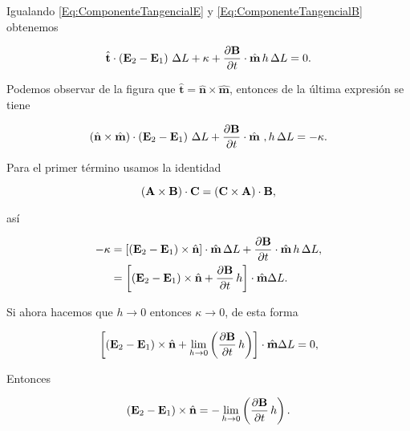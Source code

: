 Igualando \eqref{Eq:ComponenteTangencialE} y \eqref{Eq:ComponenteTangencialB} obtenemos

\begin{equation}
	\hat{\textbf{t}} \cdot \left( \E_{2} - \E_{1} \right) \, \Delta L + \kappa + \diffp{\B}{t} \cdot  \hat{\textbf{m}} \, h\, \Delta L = 0.
\end{equation}

Podemos observar de la figura que $\hat{\textbf{t}} = \hat{\textbf{n}} \times  \hat{\textbf{m}}$, entonces de la última expresión se tiene

\begin{equation}
	\left( \hat{\textbf{n}} \times  \hat{\textbf{m}} \right) \cdot \left( \E_{2} - \E_{1} \right) \, \Delta L + \diffp{\B}{t} \cdot  \hat{\textbf{m}} \ ,h \, \Delta L = -\kappa.
\end{equation}

Para el primer término usamos la identidad

\begin{equation}
\left( \textbf{A} \times \textbf{B} \right) \cdot \textbf{C} = \left( \textbf{C} \times \textbf{A} \right) \cdot \textbf{B},
\end{equation}

así

\begin{align*}
	-\kappa &= \left[ \left( \E_{2} - \E_{1} \right) \times \hat{\textbf{n}} \right] \cdot  \hat{\textbf{m}} \, \Delta L + \diffp{\B}{t} \cdot  \hat{\textbf{m}} \, h \,\Delta L,\\
					&= \left[ \left( \E_{2} - \E_{1} \right) \times \hat{\textbf{n}} + \diffp{\B}{t} \, h \right] \cdot  \hat{\textbf{m}} \Delta L.
\end{align*}

Si ahora hacemos que $h\rightarrow 0$ entonces $\kappa\rightarrow 0$, de esta forma

\begin{equation}
	\left[ \left( \E_{2} - \E_{1} \right) \times \hat{\textbf{n}} + \lim_{h\rightarrow 0} \left( \diffp{\B}{t} \, h \right) \right] \cdot  \hat{\textbf{m}} \Delta L = 0,
\end{equation}

Entonces

\begin{equation}
	\label{co f E tim}
	\left( \E_{2} - \E_{1} \right) \times \hat{\textbf{n}} = -\lim_{h\rightarrow 0} \left( \diffp{\B}{t} \, h \right).
\end{equation}


